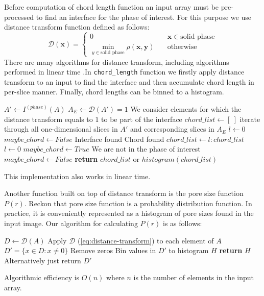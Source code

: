 \documentclass[1p]{elsarticle}
\newcommand{\code}[1]{\colorbox{light-gray}{\texttt{#1}}}
\begin{document}
Before computation of chord length function an input array must be pre-processed
to find an interface for the phase of interest. For this purpose we use
distance transform function defined as follows:
\begin{equation}
  \mathcal{D}(\bm{x})= \left\{
  \begin{array}{ll}
    0 & \quad \bm{x} \in \text{solid phase} \\
    \min\limits_{y \in \text{solid phase}} \rho(\bm{x},\bm{y}) & \quad \text{otherwise}
  \end{array}
\right. \label{eq:distance-transform}
\end{equation}
There are many algorithms for distance transform, including algorithms performed
in linear time \cite{DT}.In \code{chord\_length} function we firstly apply
distance transform to an input to find the interface and then accumulate chord
length in per-slice manner. Finally, chord lengths can be binned to a histogram.
\begin{algorithmic}[1]
    \State $A' \gets I^{(phase)}(A)$
    \State $A_E \gets \mathcal{D}(A') = 1$
    \Comment We consider elements for which the distance transform equals to $1$
    to be part of the interface
    \State $chord\_list \gets [\ ]$
      \Comment iterate through all one-dimensional slices in $A'$ and
      corresponding slices in $A_E$
      \State $l \gets 0$
      \State $maybe\_chord \gets False$
          \Comment Interface found
            \Comment Chord found
            \State $chord\_list \gets l:chord\_list$
          \EndIf
          \State $l \gets 0$
          \State $maybe\_chord \gets True$
          \Comment We are not in the phase of interest
          \State $maybe\_chord \gets False$
        \EndIf
      \EndFor
    \EndFor
    \State \textbf{return} $chord\_list$ or $histogram(chord\_list)$
  \EndProcedure
\end{algorithmic}
This implementation also works in linear time.

Another function built on top of distance transform is the pore size function
$P(r)$. Reckon that pore size function is a probability distribution
function. In practice, it is conveniently represented as a histogram of pore sizes
found in the input image. Our algorithm for calculating $P(r)$ is as follows:
\begin{algorithmic}[1]
    \State $D \gets \mathcal{D}(A)$
    \Comment Apply $\mathcal{D}$ (\cref{eq:distance-transform}) to each element of $A$
    \State $D' = \{ x \in D: x \ne 0\}$
    \Comment Remove zeros
    \State Bin values in $D'$ to histogram $H$
    \State \textbf{return} $H$
    \Comment Alternatively just return $D'$
  \EndProcedure
\end{algorithmic}
Algorithmic efficiency is $O(n)$ where $n$ is the number of elements in the
input array.
\end{document}
